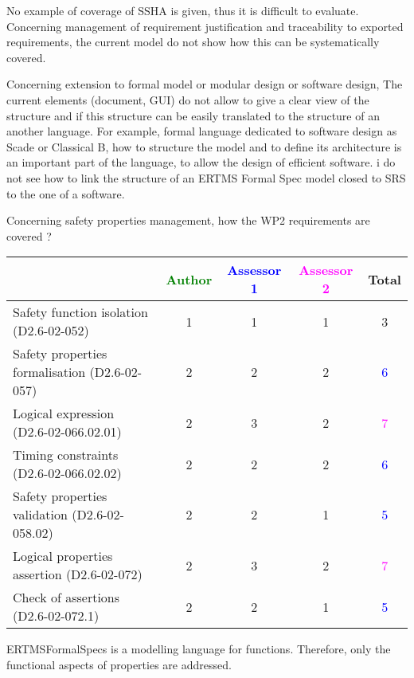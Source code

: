 \begin{assessor2}
No example of coverage of SSHA is given, thus it is difficult to evaluate. Concerning management of requirement justification and traceability to exported requirements, the current model do not show how this can be systematically covered.

Concerning extension to formal model or modular design or software design, The current elements (document, GUI)  do not allow to give a clear view of the structure and if this structure can be easily translated to  the structure of an another language. For example, formal language dedicated to software design as Scade or Classical B, how to structure the model and to define its architecture is an important part of the language, to allow the design of efficient software. i do not see how to link the structure of an ERTMS Formal Spec model closed to SRS to  the one of a software.

\end{assessor2}


Concerning safety properties management, how the WP2 requirements are covered ?

\begin{tabular}{|l | c | c | c | c|}
\hline
& \textcolor{green}{Author} & \textcolor{blue}{Assessor 1} & \textcolor{magenta}{Assessor 2} & Total \\
\hline 
Safety function isolation (D2.6-02-052)  & 1     & 1     & 1     & 3     \\
\hline 
Safety properties formalisation (D2.6-02-057)  & 2     & 2     & 2     & \textcolor{blue}{6} \\
\hline
Logical expression (D2.6-02-066.02.01)  & 2     & 3     & 2     & \textcolor{magenta}{7} \\
\hline
Timing constraints (D2.6-02-066.02.02)  & 2     & 2     & 2     & \textcolor{blue}{6} \\
\hline
Safety properties validation (D2.6-02-058.02)  & 2     & 2     & 1     & \textcolor{blue}{5} \\
\hline
Logical properties assertion (D2.6-02-072)  & 2     & 3     & 2     & \textcolor{magenta}{7} \\
\hline
Check  of assertions (D2.6-02-072.1)  & 2     & 2     & 1     & \textcolor{blue}{5} \\
\hline
\end{tabular}

\begin{author_comment}
ERTMSFormalSpecs is a modelling language for functions. Therefore, only the functional aspects of properties are addressed.  
\end{author_comment}


